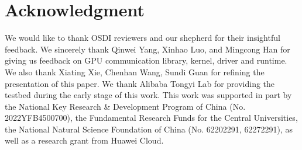 \section*{Acknowledgment}
\noindent
We would like to thank OSDI reviewers and our shepherd for
their insightful feedback. 
We sincerely thank Qinwei Yang, Xinhao Luo, and Mingcong Han
for giving us feedback on 
GPU communication library, kernel, driver and runtime.
We also thank Xiating Xie, Chenhan Wang, Sundi Guan for refining the presentation of this paper.
We thank Alibaba Tongyi Lab for providing the testbed during the early stage of this work.
This work was supported in part by
the National Key Research \& Development Program of China (No. 2022YFB4500700),
the Fundamental Research Funds for the Central Universities,
the National Natural Science Foundation of China (No. 62202291, 62272291),
as well as a research grant from Huawei Cloud.
